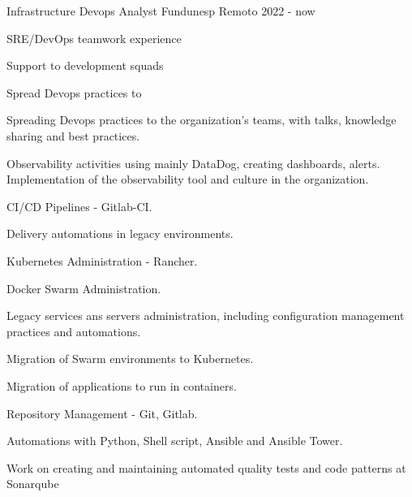 

\begin{cventries}


\cventry
{Infrastructure Devops Analyst} %
{Fundunesp} %
{Remoto} %
{2022 - now} %
{
  \begin{cvitems} %
    \item {SRE/DevOps teamwork experience}
    \item {Support to development squads}
    \item {Spread Devops practices to }
    \item {Spreading Devops practices to the organization's teams, with talks, knowledge sharing and best practices.}
    \item {Observability activities using mainly DataDog, creating dashboards, alerts. Implementation of the observability tool and culture in the organization.}
    \item {CI/CD Pipelines - Gitlab-CI.}
    \item {Delivery automations in legacy environments.}
    \item {Kubernetes Administration - Rancher.}
    \item {Docker Swarm Administration.}
    \item {Legacy services ans servers administration, including configuration management practices and automations.}
    \item {Migration of Swarm environments to Kubernetes.}
    \item {Migration of applications to run in containers.}
    \item {Repository Management - Git, Gitlab.}
    \item {Automations with Python, Shell script, Ansible and Ansible Tower.}
    \item {Work on creating and maintaining automated quality tests and code patterns at Sonarqube}
  \end{cvitems}
}


\end{cventries}
